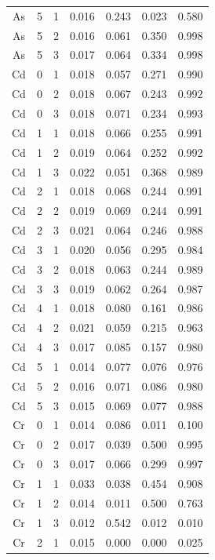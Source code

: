 \documentclass[ms, hidelinks]{uncgdissertationexp3}
\theoremstyle{plain}
\theoremstyle{definition}
\theoremstyle{remark}
\begin{document}
\begin{longtable}{ccccccc}
  As & 5 & 1 & 0.016 & 0.243 & 0.023 & 0.580\\
  \rowcolor{gray!6}  As & 5 & 2 & 0.016 & 0.061 & 0.350 & 0.998\\
  As & 5 & 3 & 0.017 & 0.064 & 0.334 & 0.998\\
  \rowcolor{gray!6}  Cd & 0 & 1 & 0.018 & 0.057 & 0.271 & 0.990\\
  Cd & 0 & 2 & 0.018 & 0.067 & 0.243 & 0.992\\
  \rowcolor{gray!6}  Cd & 0 & 3 & 0.018 & 0.071 & 0.234 & 0.993\\
  Cd & 1 & 1 & 0.018 & 0.066 & 0.255 & 0.991\\
  \rowcolor{gray!6}  Cd & 1 & 2 & 0.019 & 0.064 & 0.252 & 0.992\\
  Cd & 1 & 3 & 0.022 & 0.051 & 0.368 & 0.989\\
  \rowcolor{gray!6}  Cd & 2 & 1 & 0.018 & 0.068 & 0.244 & 0.991\\
  Cd & 2 & 2 & 0.019 & 0.069 & 0.244 & 0.991\\
  \rowcolor{gray!6}  Cd & 2 & 3 & 0.021 & 0.064 & 0.246 & 0.988\\
  Cd & 3 & 1 & 0.020 & 0.056 & 0.295 & 0.984\\
  \rowcolor{gray!6}  Cd & 3 & 2 & 0.018 & 0.063 & 0.244 & 0.989\\
  Cd & 3 & 3 & 0.019 & 0.062 & 0.264 & 0.987\\
  \rowcolor{gray!6}  Cd & 4 & 1 & 0.018 & 0.080 & 0.161 & 0.986\\
  Cd & 4 & 2 & 0.021 & 0.059 & 0.215 & 0.963\\
  \rowcolor{gray!6}  Cd & 4 & 3 & 0.017 & 0.085 & 0.157 & 0.980\\
  Cd & 5 & 1 & 0.014 & 0.077 & 0.076 & 0.976\\
  \rowcolor{gray!6}  Cd & 5 & 2 & 0.016 & 0.071 & 0.086 & 0.980\\
  Cd & 5 & 3 & 0.015 & 0.069 & 0.077 & 0.988\\
  \rowcolor{gray!6}  Cr & 0 & 1 & 0.014 & 0.086 & 0.011 & 0.100\\
  Cr & 0 & 2 & 0.017 & 0.039 & 0.500 & 0.995\\
  \rowcolor{gray!6}  Cr & 0 & 3 & 0.017 & 0.066 & 0.299 & 0.997\\
  Cr & 1 & 1 & 0.033 & 0.038 & 0.454 & 0.908\\
  \rowcolor{gray!6}  Cr & 1 & 2 & 0.014 & 0.011 & 0.500 & 0.763\\
  Cr & 1 & 3 & 0.012 & 0.542 & 0.012 & 0.010\\
  \rowcolor{gray!6}  Cr & 2 & 1 & 0.015 & 0.000 & 0.000 & 0.025\\

\end{longtable}
\end{document}
